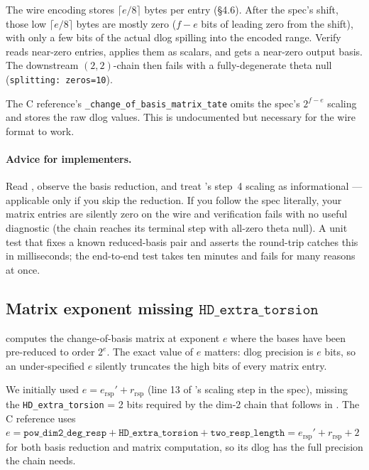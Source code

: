 The wire encoding stores $\lceil e/8 \rceil$ bytes per entry
(\S4.6).  After the spec's shift, those low $\lceil e/8 \rceil$
bytes are mostly zero ($f - e$ bits of leading zero from the shift),
with only a few bits of the actual dlog spilling into the encoded
range.  Verify reads near-zero entries, applies them as scalars,
and gets a near-zero output basis.  The downstream $(2,2)$-chain
then fails with a fully-degenerate theta null
(\texttt{splitting: zeros=10}).

The C reference's \texttt{\_change\_of\_basis\_matrix\_tate}
omits the spec's $2^{f-e}$ scaling and stores the raw dlog values.
This is undocumented but necessary for the wire format to work.

\paragraph{Advice for implementers.}  Read , observe the
basis reduction, and treat 's step~4 scaling as
informational — applicable only if you skip the reduction.  If you
follow the spec literally, your matrix entries are silently zero
on the wire and verification fails with no useful diagnostic
(the chain reaches its terminal step with all-zero theta null).
A unit test that fixes a known reduced-basis pair and asserts
the round-trip catches this in milliseconds; the end-to-end test
takes ten minutes and fails for many reasons at once.

\subsection{Matrix exponent missing $\texttt{HD\_extra\_torsion}$}
\label{sec:matrix-exponent}

 computes the change-of-basis matrix at exponent $e$
where the bases have been pre-reduced to order $2^e$.  The exact
value of $e$ matters: dlog precision is $e$ bits, so an
under-specified $e$ silently truncates the high bits of every
matrix entry.

We initially used $e = e_{\mathrm{rsp}}' + r_{\mathrm{rsp}}$ (line 13
of 's scaling step in the spec), missing the
\texttt{HD\_extra\_torsion} = 2 bits required by the dim-2 chain
that follows in .  The C reference uses $e =
\texttt{pow\_dim2\_deg\_resp} + \texttt{HD\_extra\_torsion} +
\texttt{two\_resp\_length} = e_{\mathrm{rsp}}' + r_{\mathrm{rsp}} + 2$
for both basis reduction and matrix computation, so its dlog has
the full precision the chain needs.

